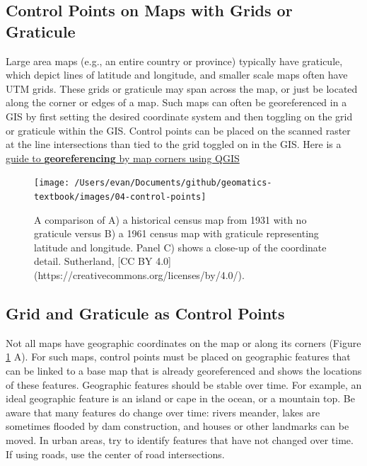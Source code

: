 \documentclass[
]{book}
\begin{document}
\hypertarget{control-points-on-maps-with-grids-or-graticule}{%
\subsection{Control Points on Maps with Grids or Graticule}\label{control-points-on-maps-with-grids-or-graticule}}

Large area maps (e.g., an entire country or province) typically have graticule, which depict lines of latitude and longitude, and smaller scale maps often have UTM grids. These grids or graticule may span across the map, or just be located along the corner or edges of a map. Such maps can often be georeferenced in a GIS by first setting the desired coordinate system and then toggling on the grid or graticule within the GIS. Control points can be placed on the scanned raster at the line intersections than tied to the grid toggled on in the GIS. Here is a \href{https://guides.lib.utexas.edu/georeference-raster-data/qgis-georeference-by-map-corners}{guide to \textbf{georeferencing} by map corners using QGIS}

\begin{figure}
\texttt{[image: /Users/evan/Documents/github/geomatics-textbook/images/04-control-points]} \caption{A comparison of A) a historical census map from 1931 with no graticule versus B) a 1961 census map with graticule representing latitude and longitude. Panel C) shows a close-up of the coordinate detail. Sutherland, [CC BY 4.0](https://creativecommons.org/licenses/by/4.0/).}\label{fig:04-control-points}
\end{figure}

\hypertarget{grid-and-graticule-as-control-points}{%
\subsection{Grid and Graticule as Control Points}\label{grid-and-graticule-as-control-points}}

Not all maps have geographic coordinates on the map or along its corners (Figure \ref{fig:04-control-points} A). For such maps, control points must be placed on geographic features that can be linked to a base map that is already georeferenced and shows the locations of these features. Geographic features should be stable over time. For example, an ideal geographic feature is an island or cape in the ocean, or a mountain top. Be aware that many features do change over time: rivers meander, lakes are sometimes flooded by dam construction, and houses or other landmarks can be moved. In urban areas, try to identify features that have not changed over time. If using roads, use the center of road intersections.
\end{document}
